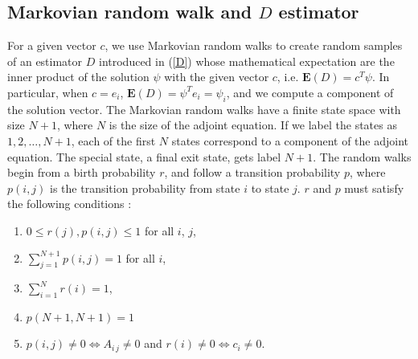 \documentclass{elsart}
\theoremstyle{remark}
\theoremstyle{definition}
\theoremstyle{proof}
\begin{document}
    \subsection{Markovian random walk and $D$ estimator}
        For a given vector $c$, we use Markovian random walks to create
        random samples of an estimator $D$ introduced in (\ref{D}) whose
        mathematical expectation are the inner product of the solution
        $\psi$ with the given vector $c$, i.e. $\mathbf{E}(D) = c^T \psi$.
        In particular, when $c=e_i$, $\mathbf{E}(D) = \psi^T e_i = \psi_i$,
        and we compute a component of the solution vector. The Markovian
        random walks have a finite state space with size $N+1$, where $N$ is
        the size of the adjoint equation. If we label the states as
        $1,2,\ldots,N+1$, each of the first $N$ states correspond to a
        component of the adjoint equation. The special state, a final exit
        state, gets label $N+1$. The random walks begin from a birth
        probability $r$, and follow a transition probability $p$, where
        $p(i,j)$ is the transition probability from state $i$ to state $j$.
        $r$ and $p$ must satisfy the following conditions \cite{Okten2005}:
        \begin{enumerate}
        \item $0\le r(j), p(i,j)\le 1$ for all $i$, $j$, \vspace{-4mm}
              \begin{equation}\label{cond1}\end{equation}
        \item $\sum_{j=1}^{N+1} p(i,j) = 1$ for all $i$, \vspace{-4mm}
              \begin{equation}\label{cond2}\end{equation}
        \item $\sum_{i=1}^N r(i) = 1$, \vspace{-4mm}
              \begin{equation}\label{cond3}\end{equation}
        \item $p(N+1,N+1) = 1$ \vspace{-4mm}
              \begin{equation}\label{cond3_5}\end{equation}
        \item $p(i,j) \ne 0 \Longleftrightarrow A_{i\,j} \ne 0$
              and $r(i) \ne 0 \Longleftrightarrow c_i \ne 0$. \vspace{-4mm}
              \begin{equation}\label{cond4}\end{equation}
        \end{enumerate}
\end{document}
